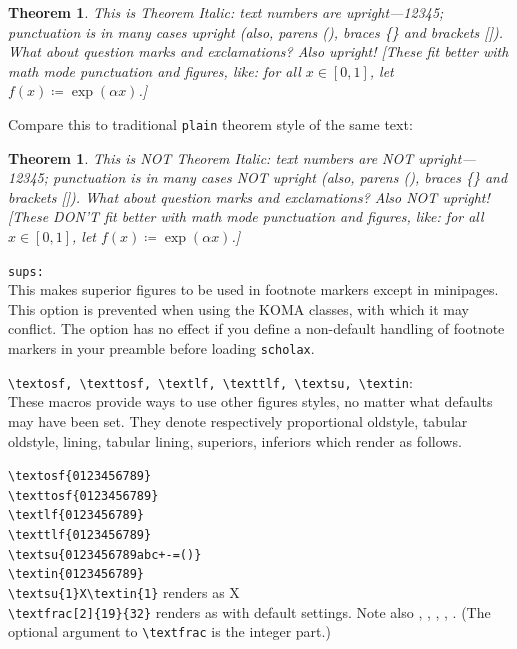 \documentclass[11pt]{article}
\theoremstyle{oldplain}
\newtheorem{oldthm}{Theorem}[section]
\theoremstyle{plain}
\newtheorem{thm}{Theorem}[section]
\begin{document}
\begin{thm}
This is Theorem Italic: text numbers are upright---12345; punctuation is in many cases upright (also, parens (), braces \{\} and brackets []). What about question marks and exclamations? Also upright! [These fit better with math mode punctuation and figures, like: for all $x\in[0,1]$, let $f(x)\coloneq \exp(\alpha x)$.]
\end{thm}
Compare this to traditional {\tt plain} theorem style of the same text:
\begin{oldthm}
This is NOT Theorem Italic: text numbers are NOT upright---12345; punctuation is in many cases NOT upright (also, parens (), braces \{\} and brackets []). What about question marks and exclamations? Also NOT upright! [These DON'T fit better with math mode punctuation and figures, like: for all $x\in[0,1]$, let $f(x)\coloneq \exp(\alpha x)$.]
\end{oldthm}



{\tt sups:}\\
This makes superior figures to be used in footnote markers except in minipages. This option is prevented when using the KOMA classes, with which it may conflict. The option has no effect if you define a non-default handling of footnote markers in your preamble before loading {\tt scholax}.


\verb|\textosf, \texttosf, \textlf, \texttlf, \textsu, \textin|:\\
These macros provide ways to use other figures styles, no matter what defaults may have been set. They denote respectively proportional oldstyle, tabular oldstyle, lining, tabular lining, superiors, inferiors which render as follows.

\verb|\textosf{0123456789}| \\
\verb|\texttosf{0123456789}| \\
\verb|\textlf{0123456789}| \\
\verb|\texttlf{0123456789}| \\
\verb|\textsu{0123456789abc+-=()}| \\
\verb|\textin{0123456789}| \\
\verb|\textsu{1}X\textin{1}| renders as X \\
\verb|\textfrac[2]{19}{32}| renders as  with default settings. Note also , , , , . (The optional argument to \verb|\textfrac| is the integer part.)
\end{document}
